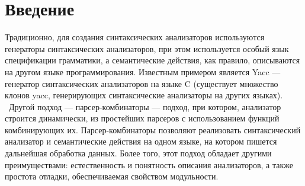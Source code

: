 \documentclass[14pt]{matmex-diploma}
\begin{document}
\maketitle
\tableofcontents
\section*{Введение}
Традиционно, для создания синтаксических анализаторов используются генераторы 
синтаксических анализаторов, при этом используется особый язык спецификации 
грамматики, а семантические действия, как правило, 
описываются на другом языке программирования.
Известным примером является Yacc \cite{johnson1975yacc} --- генератор синтаксических анализаторов на языке C 
(существует множество клонов yacc, генерирующих синтаксические анализаторы на других языках). \ 
Другой подход --- парсер-комбинаторы --- подход, при котором, анализатор строится динамически, 
из простейших парсеров с использованием функций комбинирующих их. Парсер-комбинаторы позволяют 
реализовать синтаксический анализатор и семантические действия на одном языке, 
на котором пишется дальнейшая обработка данных. 
Более того, этот подход обладает другими преимуществами: 
  естественность и понятность описания анализаторов, а также простота отладки,
  обеспечиваемая свойством модульности. 
\end{document}
